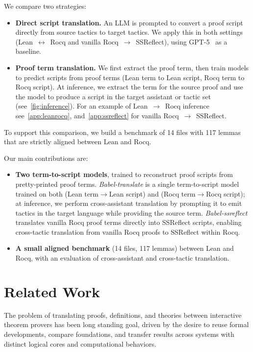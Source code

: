 \documentclass{article}
\theoremstyle{plain}
\theoremstyle{definition}
\theoremstyle{remark}
\begin{document}
	We compare two strategies:
	\begin{itemize}
		\item \textbf{Direct script translation.} An LLM is prompted to convert a proof script directly from source tactics to target tactics. We apply this in both settings (Lean~$\leftrightarrow$~Rocq and vanilla Rocq~$\to$~SSReflect), using GPT-5~\cite{gpt52025} as a baseline.
		\item \textbf{Proof term translation.} We first extract the proof term, then train models to predict scripts from proof terms (Lean term to Lean script, Rocq term to Rocq script). At inference, we extract the term for the source proof and use the model to produce a script in the target assistant or tactic set (see~\cref{fig:inference}). For an example of Lean~$\to$~Rocq inference see~\cref{app:leanrocq}, and~\cref{app:ssreflect} for vanilla Rocq~$\to$~SSReflect.
	\end{itemize}
	
	To support this comparison, we build a benchmark of 14 files with 117 lemmas that are strictly aligned between Lean and Rocq. 
	
	Our main contributions are:
	\begin{itemize}
		\item \textbf{Two term-to-script models}, trained to
                  reconstruct proof scripts from pretty-printed proof
                  terms. \textit{Babel-translate} is a single
                  term-to-script model trained on both (Lean
                  term$\to$Lean script) and (Rocq term$\to$Rocq
                  script); at inference, we perform cross-assistant
                  translation by prompting it to emit tactics in the
                  target language while providing the source
                  term. \textit{Babel-ssreflect} translates vanilla Rocq proof terms directly into SSReflect scripts, enabling cross-tactic translation from vanilla Rocq proofs to SSReflect within Rocq.
		\item \textbf{A small aligned benchmark} (14 files, 117 lemmas) between Lean and Rocq, with an evaluation of cross-assistant and cross-tactic translation.
                \end{itemize}
                
	\section{Related Work}

        The problem of translating proofs, definitions, and theories
        between interactive theorem provers has been long standing
        goal, driven by the desire to reuse formal developments,
        compare foundations, and transfer results across systems with
        distinct logical cores and computational behaviors.
\end{document}

